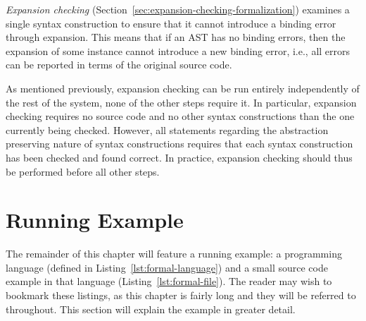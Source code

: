 \documentclass{kththesis}
\begin{document}
\emph{Expansion checking} (Section~\ref{sec:expansion-checking-formalization}) examines a single syntax construction to ensure that it cannot introduce a binding error through expansion. This means that if an AST has no binding errors, then the expansion of some instance cannot introduce a new binding error, i.e., all errors can be reported in terms of the original source code.

As mentioned previously, expansion checking can be run entirely independently of the rest of the system, none of the other steps require it. In particular, expansion checking requires no source code and no other syntax constructions than the one currently being checked. However, all statements regarding the abstraction preserving nature of syntax constructions requires that each syntax construction has been checked and found correct. In practice, expansion checking should thus be performed before all other steps.


\section{Running Example} \label{sec:running-example}

The remainder of this chapter will feature a running example: a programming language (defined in Listing~\ref{lst:formal-language}) and a small source code example in that language (Listing~\ref{lst:formal-file}). The reader may wish to bookmark these listings, as this chapter is fairly long and they will be referred to throughout. This section will explain the example in greater detail.

\end{document}
